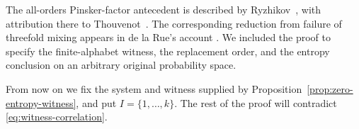 The all-orders Pinsker-factor antecedent is described by
Ryzhikov~\cite[p.~251]{Ryzhikov1997}, with attribution there to
Thouvenot~\cite{Thouvenot1975Pinsker}. The corresponding reduction
from failure of threefold mixing appears in de la Rue's account
\cite[Proposition~3.2, preprint version]{deLaRue2006}. We included
the proof to specify the finite-alphabet witness, the replacement order,
and the entropy conclusion on an arbitrary original probability space.

From now on we fix the system and witness supplied by
Proposition~\ref{prop:zero-entropy-witness}, and put $I=\{1,\ldots,k\}$.
The rest of the proof will contradict \eqref{eq:witness-correlation}.
